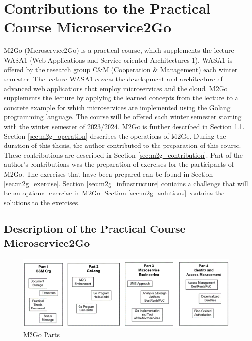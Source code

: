 \chapter{Contributions to the Practical Course Microservice2Go}
\label{cha:m2go}

M2Go (Microservice2Go) is a practical course, which supplements the lecture
WASA1 (Web Applications and Service-oriented Architectures 1). WASA1 is offered
by the research group C\&M (Cooperation \& Management) each winter semester.
The lecture WASA1 covers the development and architecture of advanced web
applications that employ microservices and the cloud. M2Go supplements the
lecture by applying the learned concepts from the lecture to a concrete example
for which microservices are implemented using the Golang programming language.
The course will be offered each winter semester starting with the winter
semester of 2023/2024. M2Go is further described in Section
\ref{sec:m2g_description}. Section \ref{sec:m2g_operation} describes the
operations of M2Go. During the duration of this thesis, the author contributed
to the preparation of this course. These contributions are described in Section
\ref{sec:m2g_contribution}. Part of the author's contributions was the
preparation of exercises for the participants of M2Go. 
The exercises that have been prepared can be found in
Section \ref{sec:m2g_exercise}. Section \ref{sec:m2g_infrastructure} contains
a challenge that will be an optional exercise in M2Go.
Section \ref{sec:m2g_solutions} contains the solutions to the exercises.

\section{Description of the Practical Course Microservice2Go}
\label{sec:m2g_description}

\begin{figure}[tb]
	\centering
	\includegraphics[width=\textwidth]{figures/8.1_m2go_parts.png}
	\caption{M2Go Parts \cite{CM-W-M2G}}
	\label{fig:m2go_parts}
\end{figure}

